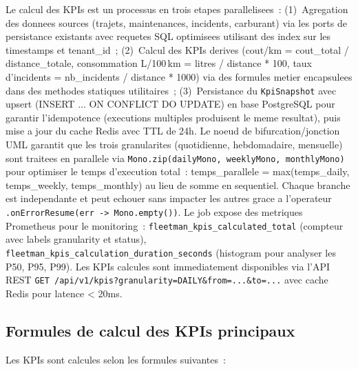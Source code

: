 \documentclass[12pt,a4paper]{report}
\begin{document}
\begin{enumerate}[leftmargin=2cm]
\begin{lecture}
Le calcul des KPIs est un processus en trois etapes parallelisees~:
(1)~Agregation des donnees sources (trajets, maintenances, incidents,
carburant) via les ports de persistance existants avec requetes SQL
optimisees utilisant des index sur les timestamps et tenant\_id~;
(2)~Calcul des KPIs derives (cout/km = cout\_total / distance\_totale,
consommation L/100\,km = litres / distance * 100, taux d'incidents =
nb\_incidents / distance * 1000) via des formules metier encapsulees
dans des methodes statiques utilitaires~;
(3)~Persistance du \texttt{KpiSnapshot} avec upsert (INSERT ... ON CONFLICT
DO UPDATE) en base PostgreSQL pour garantir l'idempotence (executions
multiples produisent le meme resultat), puis mise a jour du cache Redis
avec TTL de 24h. Le noeud de bifurcation/jonction UML garantit que les
trois granularites (quotidienne, hebdomadaire, mensuelle) sont traitees
en parallele via \texttt{Mono.zip(dailyMono, weeklyMono, monthlyMono)}
pour optimiser le temps d'execution total~: temps\_parallele = max(temps\_daily,
temps\_weekly, temps\_monthly) au lieu de somme en sequentiel. Chaque
branche est independante et peut echouer sans impacter les autres grace
a l'operateur \texttt{.onErrorResume(err -> Mono.empty())}. Le job expose
des metriques Prometheus pour le monitoring~:
\texttt{fleetman\_kpis\_calculated\_total} (compteur avec labels granularity
et status), \texttt{fleetman\_kpis\_calculation\_duration\_seconds} (histogram
pour analyser les P50, P95, P99). Les KPIs calcules sont immediatement
disponibles via l'API REST \texttt{GET /api/v1/kpis?granularity=DAILY\&from=...\&to=...}
avec cache Redis pour latence < 20ms.
\end{lecture}

\subsection{Formules de calcul des KPIs principaux}

Les KPIs sont calcules selon les formules suivantes~:


\end{enumerate}
\end{document}
